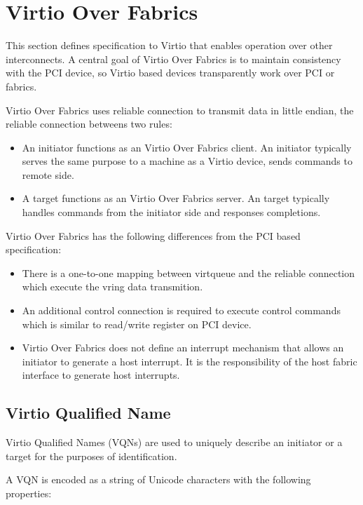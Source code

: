 \section{Virtio Over Fabrics}\label{sec:Virtio Transport Options / Virtio Over Fabrics}

This section defines specification to Virtio that enables operation over other
interconnects. A central goal of Virtio Over Fabrics is to maintain consistency
with the PCI device, so Virtio based devices transparently work over PCI or
fabrics.

Virtio Over Fabrics uses reliable connection to transmit data in little endian,
the reliable connection betweens two rules:

\begin{itemize}
\item An initiator functions as an Virtio Over Fabrics client. An initiator typically serves the same purpose to a machine as a Virtio device, sends commands to remote side.
\item A target functions as an Virtio Over Fabrics server. An target typically handles commands from the initiator side and responses completions.
\end{itemize}

Virtio Over Fabrics has the following differences from the PCI based specification:

\begin{itemize}
\item There is a one-to-one mapping between virtqueue and the reliable connection which execute the vring data transmition.
\item An additional control connection is required to execute control commands which is similar to read/write register on PCI device.
\item Virtio Over Fabrics does not define an interrupt mechanism that allows an initiator to generate a host interrupt. It is the responsibility of the host fabric interface to generate host interrupts.
\end{itemize}

\subsection{Virtio Qualified Name}\label{sec:Virtio Transport Options / Virtio Over Fabrics / Virtio Qualified Name}
Virtio Qualified Names (VQNs) are used to uniquely describe an initiator or a target for the purposes of identification.

A VQN is encoded as a string of Unicode characters with the following properties:


